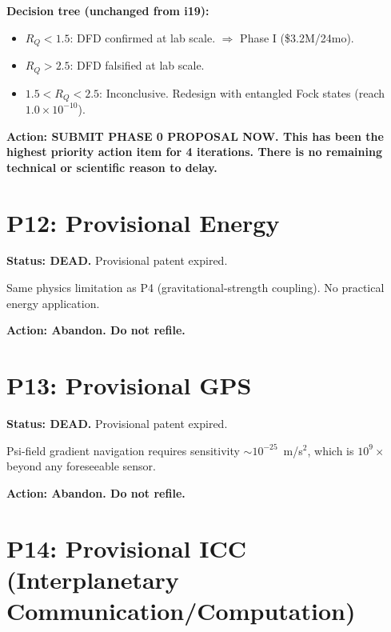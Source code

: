 \documentclass[11pt]{article}
\newcommand{\ee}[1]{\times 10^{#1}}
\begin{document}
\textbf{Decision tree (unchanged from i19):}
\begin{itemize}
\item $R_Q < 1.5$: DFD confirmed at lab scale.  $\Rightarrow$ Phase I
  (\$3.2M/24mo).
\item $R_Q > 2.5$: DFD falsified at lab scale.
\item $1.5 < R_Q < 2.5$: Inconclusive.  Redesign with entangled Fock
  states (reach $1.0\ee{-10}$).
\end{itemize}

\textbf{Action: SUBMIT PHASE 0 PROPOSAL NOW.  This has been the highest
priority action item for 4 iterations.  There is no remaining technical
or scientific reason to delay.}


\section{P12: Provisional Energy}

\textbf{Status: DEAD.}  Provisional patent expired.

Same physics limitation as P4 (gravitational-strength coupling).
No practical energy application.

\textbf{Action: Abandon.  Do not refile.}


\section{P13: Provisional GPS}

\textbf{Status: DEAD.}  Provisional patent expired.

Psi-field gradient navigation requires sensitivity $\sim 10^{-25}$~m/s$^2$,
which is $10^9\times$ beyond any foreseeable sensor.

\textbf{Action: Abandon.  Do not refile.}


\section{P14: Provisional ICC (Interplanetary Communication/Computation)}
\end{document}

